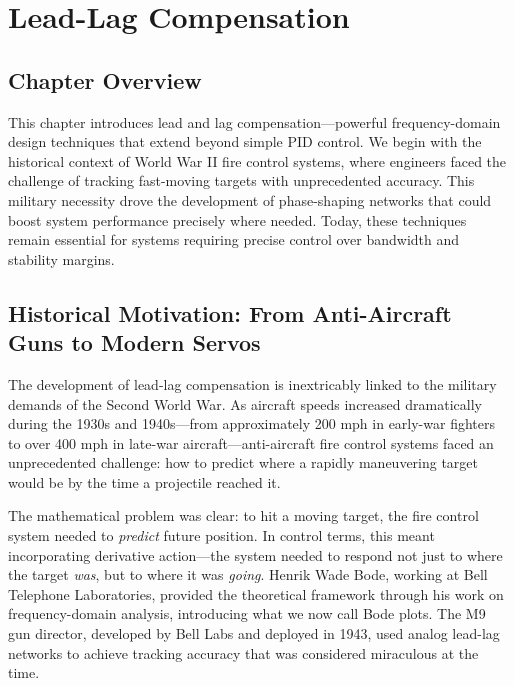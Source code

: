 
\chapter{Lead-Lag Compensation}
\label{ch:lead_lag}

\section*{Chapter Overview}

This chapter introduces lead and lag compensation---powerful frequency-domain design techniques that extend beyond simple PID control. We begin with the historical context of World War II fire control systems, where engineers faced the challenge of tracking fast-moving targets with unprecedented accuracy. This military necessity drove the development of phase-shaping networks that could boost system performance precisely where needed. Today, these techniques remain essential for systems requiring precise control over bandwidth and stability margins.

\section{Historical Motivation: From Anti-Aircraft Guns to Modern Servos}
\label{sec:lead_lag_history}

\begin{historicalbox}
The development of lead-lag compensation is inextricably linked to the military demands of the Second World War. As aircraft speeds increased dramatically during the 1930s and 1940s---from approximately 200 mph in early-war fighters to over 400 mph in late-war aircraft---anti-aircraft fire control systems faced an unprecedented challenge: how to predict where a rapidly maneuvering target would be by the time a projectile reached it.

The mathematical problem was clear: to hit a moving target, the fire control system needed to \textit{predict} future position. In control terms, this meant incorporating derivative action---the system needed to respond not just to where the target \textit{was}, but to where it was \textit{going}. Henrik Wade Bode, working at Bell Telephone Laboratories, provided the theoretical framework through his work on frequency-domain analysis, introducing what we now call Bode plots. The M9 gun director, developed by Bell Labs and deployed in 1943, used analog lead-lag networks to achieve tracking accuracy that was considered miraculous at the time.
\end{historicalbox}

